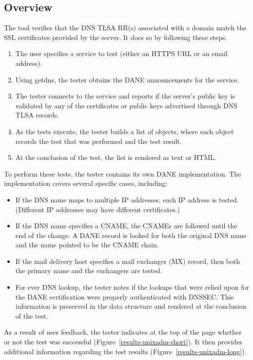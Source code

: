 \documentclass[preprint,3p,11pt]{elsarticle}
\begin{document}
\subsection{Overview}

The tool verifies that the DNS TLSA RR(s) associated with a domain
match the SSL certificates provided by the server. It does so by following these steps. 

\begin{enumerate}
\item The user specifies a service to test (either an HTTPS URL or an
  email address).
\item Using getdns, the tester obtains the DANE announcements for the
  service. 
\item The tester connects to the service and reports if the server's
  public key is validated by any of the   certificates or public keys
  advertised through DNS TLSA records. 
\item As the tests execute, the tester builds a list of objects, where
  each object records the test that was performed and the test result.
\item At the conclusion of the test, the list is rendered as text or
  HTML.
\end{enumerate}

To perform these tests, the tester contains its own DANE
implementation. The implementation covers several specific cases,
including:

\begin{itemize}
\item If the DNS name maps to multiple IP addresses, each IP address
  is tested. (Different IP addresses may have different certificates.)
\item If the DNS name specifies a CNAME, the CNAMEs are followed until
  the end of the change. A DANE record is looked for both the original
  DNS name and the name pointed to be the CNAME chain.
\item If the mail delivery host specifies a mail exchanger (MX)
  record, then both the primary name and the exchangers are tested.
\item For ever DNS lookup, the tester notes if the lookups that were
  relied upon for the DANE certification were
  properly authenticated with DNSSEC. This information is preserved in
  the data structure and rendered at the conclusion of the test. 
\end{itemize}

As a result of user feedback, the tester indicates at the top of the
page whether or not the test was successful (Figure~\ref{results-unixadm-short}). It then provides
additional information regarding the test results (Figure~\ref{results-unixadm-long}).
\end{document}
